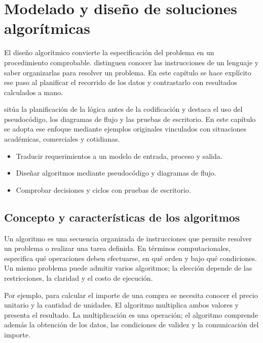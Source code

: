 \chapter{Modelado y diseño de soluciones algorítmicas}
\label{cap:02-diseno-algoritmico}

El diseño algorítmico convierte la especificación del problema en un procedimiento comprobable. \textcite{robins2003} distinguen conocer las instrucciones de un lenguaje y saber organizarlas para resolver un problema. En este capítulo se hace explícito ese paso al planificar el recorrido de los datos y contrastarlo con resultados calculados a mano.

\textcite[pp.~9–10]{farrell2013} sitúa la planificación de la lógica antes de la codificación y destaca el uso del pseudocódigo, los diagramas de flujo y las pruebas de escritorio. En este capítulo se adopta ese enfoque mediante ejemplos originales vinculados con situaciones académicas, comerciales y cotidianas.

\begin{resultados}
  \begin{itemize}
    \item Traducir requerimientos a un modelo de entrada, proceso y salida.
    \item Diseñar algoritmos mediante pseudocódigo y diagramas de flujo.
    \item Comprobar decisiones y ciclos con pruebas de escritorio.
  \end{itemize}
\end{resultados}

\section{Concepto y características de los algoritmos}

Un algoritmo es una secuencia organizada de instrucciones que permite resolver un problema o realizar una tarea definida. En términos computacionales, especifica qué operaciones deben efectuarse, en qué orden y bajo qué condiciones. Un mismo problema puede admitir varios algoritmos; la elección depende de las restricciones, la claridad y el costo de ejecución.

Por ejemplo, para calcular el importe de una compra se necesita conocer el precio unitario y la cantidad de unidades. El algoritmo multiplica ambos valores y presenta el resultado. La multiplicación es una operación; el algoritmo comprende además la obtención de los datos, las condiciones de validez y la comunicación del importe.

